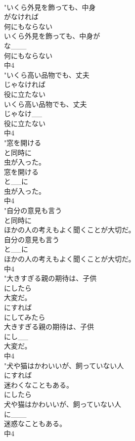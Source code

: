 \documentclass[8pt]{extreport}
\begin{document}
\begin{CJK}{UTF8}{min}
\\	"いくら外見を飾っても、中身
\\	がなければ
\\	何にもならない
\\	いくら外見を飾っても、中身が
\\	な___
\\	何にもならない
\\	中4
\\	"いくら高い品物でも、丈夫
\\	じゃなければ
\\	役に立たない
\\	いくら高い品物でも、丈夫
\\	じゃなけ__
\\	役に立たない
\\	中4
\\	"窓を開ける
\\	と同時に
\\	虫が入った。
\\	窓を開ける
\\	と__に
\\	虫が入った。
\\	中4
\\	"自分の意見も言う
\\	と同時に
\\	ほかの人の考えもよく聞くことが大切だ。
\\	自分の意見も言う
\\	と__に
\\	ほかの人の考えもよく聞くことが大切だ。
\\	中4
\\	"大きすぎる親の期待は、子供
\\	にしたら
\\	大変だ。
\\	にすれば
\\	にしてみたら
\\	大きすぎる親の期待は、子供
\\	にし__
\\	大変だ。
\\	中4
\\	"犬や猫はかわいいが、飼っていない人
\\	にすれば
\\	迷わくなこともある。
\\	にしたら
\\	犬や猫はかわいいが、飼っていない人
\\	に___
\\	迷惑なこともある。
\\	中4

\end{CJK}
\end{document}
